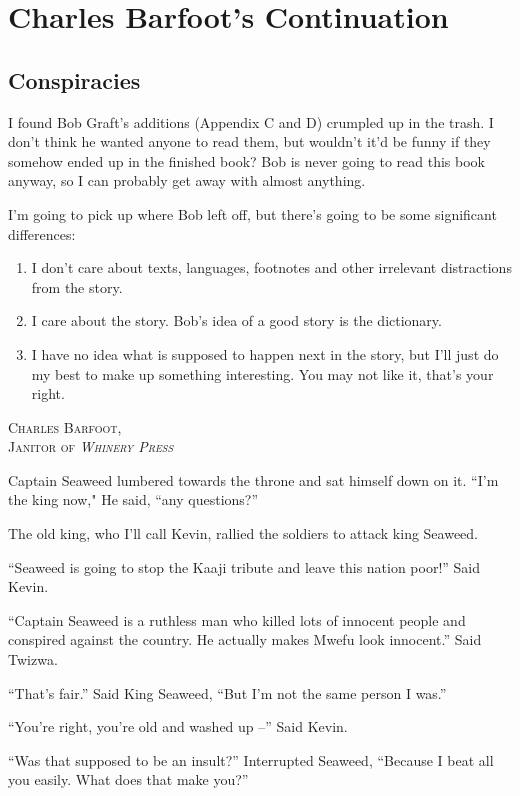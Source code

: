 \chapter{Charles Barfoot's Continuation}
\section{Conspiracies}
I found Bob Graft's additions (Appendix C and D) crumpled up in the trash. I don't think he wanted anyone to read them, but wouldn't it'd be funny if they somehow ended up in the finished book? Bob is never going to read this book anyway, so I can probably get away with almost anything.

I'm going to pick up where Bob left off, but there's going to be some significant differences:
\begin{enumerate}
\item I don't care about texts, languages, footnotes and other irrelevant distractions from the story.
\item I care about the story. Bob's idea of a good story is the dictionary.
\item I have no idea what is supposed to happen next in the story, but I'll just do my best to make up something interesting. You may not like it, that's your right.
\end{enumerate}

\begin{flushright}
\textsc{
Charles Barfoot,\\
Janitor of \emph{Whinery Press}}
\end{flushright}

Captain Seaweed lumbered towards the throne and sat himself down on it.
``I'm the king now," He said, ``any questions?''

The old king, who I'll call Kevin, rallied the soldiers to attack king Seaweed.

``Seaweed is going to stop the Kaaji tribute and leave this nation poor!'' Said Kevin.

``Captain Seaweed is a ruthless man who killed lots of innocent people and conspired against the country. He actually makes Mwefu look innocent.'' Said Twizwa.

``That's fair.'' Said King Seaweed, ``But I'm not the same person I was.''

``You're right, you're old and washed up --'' Said Kevin.

``Was that supposed to be an insult?'' Interrupted Seaweed, ``Because I beat all you easily. What does that make you?''

